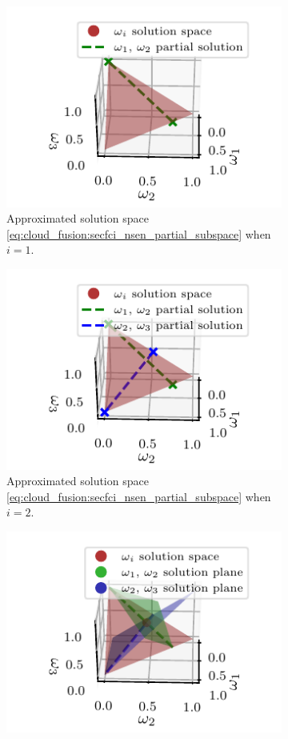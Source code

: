 \begin{figure}[htbp]
    \begin{subfigure}[htbp]{\textwidth}
        \begin{center}
            \includegraphics{figures/partial_sol1.pdf}
        \end{center}
        \caption{Approximated solution space \eqref{eq:cloud_fusion:secfci_nsen_partial_subspace} when $i=1$.}
        \label{fig:3_sensor_partial_sol}
    \end{subfigure}
    \hfill
    \begin{subfigure}[htbp]{\textwidth}
        \begin{center}
            \includegraphics{figures/partial_sols.pdf}
        \end{center}
        \caption{Approximated solution space \eqref{eq:cloud_fusion:secfci_nsen_partial_subspace} when $i=2$.}
        \label{fig:3_sensor_partial_sols}
    \end{subfigure}
    \hfill
    \begin{subfigure}[htbp]{\textwidth}
        \begin{center}
            \includegraphics{figures/partial_sol_planes.pdf}

\end{center}
\end{subfigure}
\end{figure}
